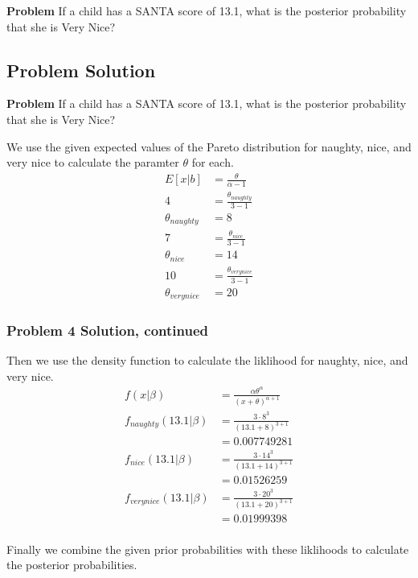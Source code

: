 \documentclass[12pt]{article}
\theoremstyle{definition}
\begin{document}
\bigskip
\noindent
{\bf Problem} If a child has a SANTA score of 13.1, what is the posterior probability that she is Very Nice?




\subsection*{Problem Solution}

\noindent
{\bf Problem} If a child has a SANTA score of 13.1, what is the posterior probability that she is Very Nice?

We use the given expected values of the Pareto distribution for naughty, nice, and very nice to calculate the paramter $\theta$ for each.
\begin{align*}
E[x|b] &= \frac{\theta}{\alpha - 1}\\
4 &= \frac{\theta_{naughty}}{3 - 1}\\
\theta_{naughty} &= 8\\
7 &= \frac{\theta_{nice}}{3 - 1}\\
\theta_{nice} &= 14\\
10 &= \frac{\theta_{very nice}}{3 - 1}\\
\theta_{very nice} &= 20
\end{align*}

\newpage
\subsubsection*{Problem 4 Solution, continued}

Then we use the density function to calculate the liklihood for naughty, nice, and very nice.
\begin{align*}
f(x|\beta) &= \frac{\alpha\theta^\alpha}{(x + \theta)^{\alpha + 1}}\\
f_{naughty}(13.1|\beta) &= \frac{3 \cdot 8^3}{(13.1 + 8)^{3 + 1}}\\
&= 0.007749281\\
f_{nice}(13.1|\beta) &= \frac{3 \cdot 14^3}{(13.1 + 14)^{3 + 1}}\\
&= 0.01526259\\
f_{verynice}(13.1|\beta) &= \frac{3 \cdot 20^3}{(13.1 + 20)^{3 + 1}}\\
&= 0.01999398\\
\end{align*}

Finally we combine the given prior probabilities with these liklihoods to calculate the posterior probabilities.\\
\end{document}
